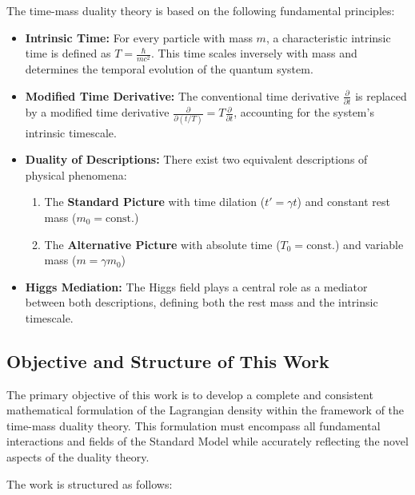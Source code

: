 \documentclass[a4paper,12pt]{article}
\begin{document}
	The time-mass duality theory is based on the following fundamental principles:
	
	\begin{itemize}
		\item \textbf{Intrinsic Time:} For every particle with mass \( m \), a characteristic intrinsic time is defined as \( T = \frac{\hbar}{mc^2} \). This time scales inversely with mass and determines the temporal evolution of the quantum system.
		\item \textbf{Modified Time Derivative:} The conventional time derivative \( \frac{\partial}{\partial t} \) is replaced by a modified time derivative \( \frac{\partial}{\partial(t/T)} = T \frac{\partial}{\partial t} \), accounting for the system’s intrinsic timescale.
		\item \textbf{Duality of Descriptions:} There exist two equivalent descriptions of physical phenomena:
		\begin{enumerate}
			\item The \textbf{Standard Picture} with time dilation (\( t' = \gamma t \)) and constant rest mass (\( m_0 = \text{const.} \))
			\item The \textbf{Alternative Picture} with absolute time (\( T_0 = \text{const.} \)) and variable mass (\( m = \gamma m_0 \))
		\end{enumerate}
		\item \textbf{Higgs Mediation:} The Higgs field plays a central role as a mediator between both descriptions, defining both the rest mass and the intrinsic timescale.
	\end{itemize}
	
	\subsection{Objective and Structure of This Work}
	
	The primary objective of this work is to develop a complete and consistent mathematical formulation of the Lagrangian density within the framework of the time-mass duality theory. This formulation must encompass all fundamental interactions and fields of the Standard Model while accurately reflecting the novel aspects of the duality theory.
	
	The work is structured as follows:
	
\end{document}
